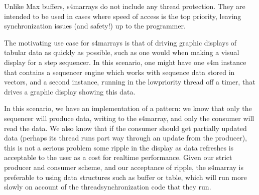 \documentclass[letterpaper,10pt,english]{sphinxmanual}
\begin{document}
\begin{sphinxVerbatim}[commandchars=\\\{\}]


\end{sphinxVerbatim}

\sphinxAtStartPar
Unlike Max buffers, s4m\sphinxhyphen{}arrays do not
include any thread protection. They are intended to be used in cases
where speed of access is the top priority, leaving synchronization issues
(and safety!) up to the programmer.

\sphinxAtStartPar
The motivating use case for s4m\sphinxhyphen{}arrays is that of driving graphic displays
of tabular data as quickly as possible, such as
one would when making a visual display for a step sequencer.
In this scenario, one might have one s4m instance
that contains a sequencer engine which works with sequence data stored in vectors,
and a second instance, running in the low\sphinxhyphen{}priority thread off a timer, that drives
a graphic display showing this data.

\sphinxAtStartPar
In this scenario, we have an implementation of a 
pattern: we know that only the sequencer will produce data, writing to the
s4m\sphinxhyphen{}array, and only the consumer will read the data.
We also know that if the consumer should get partially updated data
(perhaps its thread runs part way through an update from the producer),
this is not a serious problem \sphinxhyphen{} some ripple in the display as data refreshes
is acceptable to the user as a cost for realtime performance.
Given our strict producer and consumer scheme, and our acceptance of ripple,
the s4m\sphinxhyphen{}array is preferable to using data structures such as buffer or table,
which will run more slowly on account of the thread\sphinxhyphen{}synchronization code
that they run.
\end{document}
